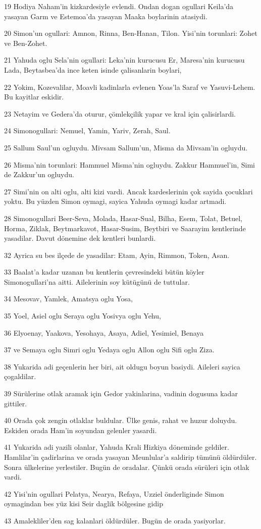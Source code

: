 \par 19 Hodiya Naham'in kizkardesiyle evlendi. Ondan dogan ogullari Keila'da yasayan Garm ve Estemoa'da yasayan Maaka boylarinin atasiydi.
\par 20 Simon'un ogullari: Amnon, Rinna, Ben-Hanan, Tilon. Yisi'nin torunlari: Zohet ve Ben-Zohet.
\par 21 Yahuda oglu Sela'nin ogullari: Leka'nin kurucusu Er, Maresa'nin kurucusu Lada, Beytasbea'da ince keten isinde çalisanlarin boylari,
\par 22 Yokim, Kozevalilar, Moavli kadinlarla evlenen Yoas'la Saraf ve Yasuvi-Lehem. Bu kayitlar eskidir.
\par 23 Netayim ve Gedera'da oturur, çömlekçilik yapar ve kral için çalisirlardi.
\par 24 Simonogullari: Nemuel, Yamin, Yariv, Zerah, Saul.
\par 25 Sallum Saul'un ogluydu. Mivsam Sallum'un, Misma da Mivsam'in ogluydu.
\par 26 Misma'nin torunlari: Hammuel Misma'nin ogluydu. Zakkur Hammuel'in, Simi de Zakkur'un ogluydu.
\par 27 Simi'nin on alti oglu, alti kizi vardi. Ancak kardeslerinin çok sayida çocuklari yoktu. Bu yüzden Simon oymagi, sayica Yahuda oymagi kadar artmadi.
\par 28 Simonogullari Beer-Seva, Molada, Hasar-Sual, Bilha, Esem, Tolat, Betuel, Horma, Ziklak, Beytmarkavot, Hasar-Susim, Beytbiri ve Saarayim kentlerinde yasadilar. Davut dönemine dek kentleri bunlardi.
\par 32 Ayrica su bes ilçede de yasadilar: Etam, Ayin, Rimmon, Token, Asan.
\par 33 Baalat'a kadar uzanan bu kentlerin çevresindeki bütün köyler Simonogullari'na aitti. Ailelerinin soy kütügünü de tuttular.
\par 34 Mesovav, Yamlek, Amatsya oglu Yosa,
\par 35 Yoel, Asiel oglu Seraya oglu Yosivya oglu Yehu,
\par 36 Elyoenay, Yaakova, Yesohaya, Asaya, Adiel, Yesimiel, Benaya
\par 37 ve Semaya oglu Simri oglu Yedaya oglu Allon oglu Sifi oglu Ziza.
\par 38 Yukarida adi geçenlerin her biri, ait oldugu boyun basiydi. Aileleri sayica çogaldilar.
\par 39 Sürülerine otlak aramak için Gedor yakinlarina, vadinin dogusuna kadar gittiler.
\par 40 Orada çok zengin otlaklar buldular. Ülke genis, rahat ve huzur doluydu. Eskiden orada Ham'in soyundan gelenler yasardi.
\par 41 Yukarida adi yazili olanlar, Yahuda Krali Hizkiya döneminde geldiler. Hamlilar'in çadirlarina ve orada yasayan Meunlular'a saldirip tümünü öldürdüler. Sonra ülkelerine yerlestiler. Bugün de oradalar. Çünkü orada sürüleri için otlak vardi.
\par 42 Yisi'nin ogullari Pelatya, Nearya, Refaya, Uzziel önderliginde Simon oymagindan bes yüz kisi Seir daglik bölgesine gidip
\par 43 Amalekliler'den sag kalanlari öldürdüler. Bugün de orada yasiyorlar.

